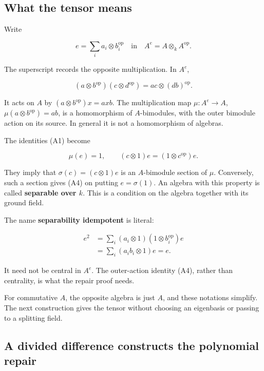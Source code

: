 \documentclass[
  11pt,
]{article}
\begin{document}
\subsection{What the tensor means}\label{what-the-tensor-means}

Write

\[
e=\sum_i a_i\otimes b_i^{\mathrm{op}}
\quad\text{in}\quad A^e=A\otimes_k A^{\mathrm{op}}.
\]

The superscript records the opposite multiplication. In \(A^e\),

\[
(a\otimes b^{\mathrm{op}})(c\otimes d^{\mathrm{op}})
   =ac\otimes(db)^{\mathrm{op}}.
\]

It acts on \(A\) by \((a\otimes b^{\mathrm{op}})x=axb\). The
multiplication map \(\mu:A^e\to A\),
\(\mu(a\otimes b^{\mathrm{op}})=ab\), is a homomorphism of
\(A\)-bimodules, with the outer bimodule action on its source. In
general it is not a homomorphism of algebras.

The identities (A1) become

\[
\mu(e)=1,\qquad
(c\otimes1)e=(1\otimes c^{\mathrm{op}})e.             \tag{A4}
\]

They imply that \(\sigma(c)=(c\otimes1)e\) is an \(A\)-bimodule section
of \(\mu\). Conversely, such a section gives (A4) on putting
\(e=\sigma(1)\). An algebra with this property is called
\textbf{separable over \(k\)}. This is a condition on the algebra
together with its ground field.

The name \textbf{separability idempotent} is literal:

\[
\begin{aligned}
e^2
 &=\sum_i(a_i\otimes1)(1\otimes b_i^{\mathrm{op}})e\\
 &=\sum_i(a_i b_i\otimes1)e=e.
\end{aligned}
\]

It need not be central in \(A^e\). The outer-action identity (A4),
rather than centrality, is what the repair proof needs.

For commutative \(A\), the opposite algebra is just \(A\), and these
notations simplify. The next construction gives the tensor without
choosing an eigenbasis or passing to a splitting field.

\subsection{A divided difference constructs the polynomial
repair}\label{a-divided-difference-constructs-the-polynomial-repair}
\end{document}
